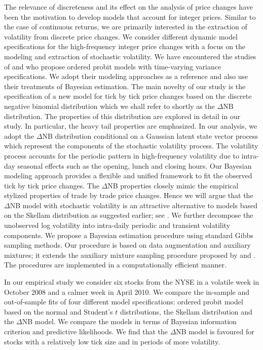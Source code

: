 \documentclass[12pt]{article}
\begin{document}
The relevance of discreteness and its effect on the analysis of
price changes have been the motivation to develop models that account for
integer prices.
Similar to the case of continuous returns, we are primarily interested in
the extraction of volatility from discrete price changes.
We consider different dynamic model specifications
for the high-frequency integer price changes with a focus on the modeling
and extraction of stochastic volatility.
We have encountered the studies of
\citet{MullerCzado2006} and \citet{Stefanos2015}
who propose ordered probit models with time-varying variance specifications.
We adopt their modeling approaches as a reference and also use their
treatments of Bayesian estimation.
The main novelty of our study is the specification of 
a new model for tick by tick price changes based on
the discrete negative binomial distribution which we shall
refer to shortly as the $\Delta$NB distribution.
The properties of this distribution are explored in detail in our study.
In particular, the heavy tail properties are emphasized.
In our analysis, we adopt the $\Delta$NB distribution conditional
on a Gaussian latent state vector process which represent the
components of the stochastic volatility process.
The volatility process accounts for the periodic pattern in
high-frequency volatility due to intra-day seasonal effects such as the
opening, lunch and closing hours.
Our Bayesian modeling approach provides a flexible and unified framework
to fit the observed tick by tick price changes.
The $\Delta$NB properties closely mimic
the empirical stylized properties of trade by trade price changes.
Hence we will argue that the $\Delta$NB model with stochastic volatility
is an attractive alternative to models based on the Skellam
distribution as suggested earlier; see \citet{KoopmanLucasLit2014}.
We further decompose the unobserved log volatility
into intra-daily periodic and transient volatility components.
We propose a Bayesian estimation procedure using standard
Gibbs sampling methods.
Our procedure is based on data augmentation and auxiliary mixtures;
it extends the auxiliary mixture sampling procedure proposed by
\citet{SFSWagner2006} and \citet{SFSFHeldRue2009}.
The procedures are implemented in a computationally efficient manner.


In our empirical study we consider
six stocks from the NYSE in a volatile week in October 2008
and a calmer week in April 2010.
We compare the in-sample and out-of-sample fits of four different
model specifications:
ordered probit model based on the normal and Student's $t$ distributions,
the Skellam distribution and the $\Delta$NB model.
%
%
%
We compare the models in terms of Bayesian information criterion
and predictive likelihoods. We find that the $\Delta$NB model
is favoured for stocks with a relatively low tick size and
in periods of more volatility.
\end{document}
